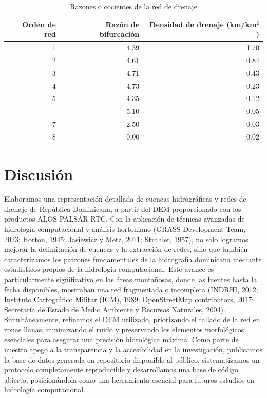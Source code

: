 \documentclass[spanish]{article}
\begin{document}
\begin{table}[H]

\caption{\label{tab:tablaredesordratios}Razones o cocientes de la red de drenaje}
\centering
\begin{tabular}[t]{rrr}
\toprule
Orden de red & Razón de bifurcación & Densidad de drenaje (km/km$^2$)\\
\midrule
1 & 4.39 & 1.70\\
2 & 4.61 & 0.84\\
3 & 4.71 & 0.43\\
4 & 4.73 & 0.23\\
5 & 4.35 & 0.12\\
\addlinespace
6 & 5.10 & 0.05\\
7 & 2.50 & 0.03\\
8 & 0.00 & 0.02\\
\bottomrule
\end{tabular}
\end{table}

\hypertarget{discusiuxf3n}{%
\section{Discusión}\label{discusiuxf3n}}

Elaboramos una representación detallada de cuencas hidrográficas y redes
de drenaje de República Dominicana, a partir del DEM proporcionado con
los productos ALOS PALSAR RTC. Con la aplicación de técnicas avanzadas
de hidrología computacional y análisis hortoniano (GRASS Development
Team, 2023; Horton, 1945; Jasiewicz y Metz, 2011; Strahler, 1957), no
sólo logramos mejorar la delimitación de cuencas y la extracción de
redes, sino que también caracterizamos los patrones fundamentales de la
hidrografía dominicana mediante estadísticos propios de la hidrología
computacional. Este avance es particularmente significativo en las áreas
montañosas, donde las fuentes hasta la fecha disponibles, mostraban una
red fragmentada o incompleta (INDRHI, 2012; Instituto Cartográfico
Militar (ICM), 1989; OpenStreetMap contributors, 2017; Secretaría de
Estado de Medio Ambiente y Recursos Naturales, 2004). Simultáneamente,
refinamos el DEM utilizado, priorizando el tallado de la red en zonas
llanas, minimizando el ruido y preservando los elementos morfológicos
esenciales para asegurar una precisión hidrológica máxima. Como parte de
nuestro apego a la transparencia y la accesibilidad en la investigación,
publicamos la base de datos generada en repositorio disponible al
público, sistematizamos un protocolo completamente reproducible y
desarrollamos una base de código abierto, posicionándola como una
herramienta esencial para futuros estudios en hidrología computacional.
\end{document}
